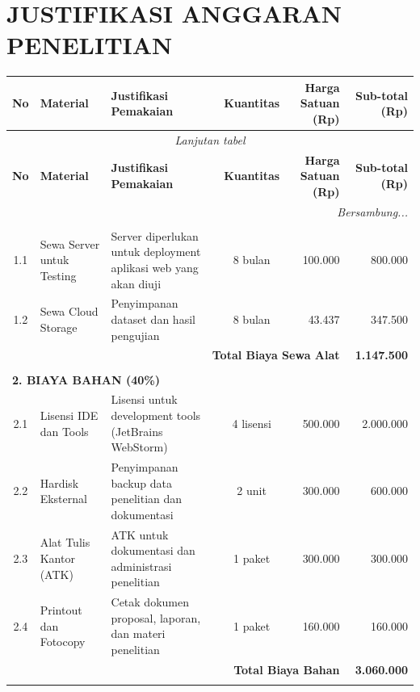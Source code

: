 \chapter{JUSTIFIKASI ANGGARAN PENELITIAN}

{\footnotesize
\begin{longtable}{|c|p{2.5cm}|p{3.5cm}|c|r|r|}
\hline
\textbf{No} & \textbf{Material} & \textbf{Justifikasi Pemakaian} & \textbf{Kuantitas} & \textbf{Harga Satuan (Rp)} & \textbf{Sub-total (Rp)} \\
\hline
\endfirsthead

\multicolumn{6}{c}{\textit{Lanjutan tabel}} \\
\hline
\textbf{No} & \textbf{Material} & \textbf{Justifikasi Pemakaian} & \textbf{Kuantitas} & \textbf{Harga Satuan (Rp)} & \textbf{Sub-total (Rp)} \\
\hline
\endhead

\hline
\multicolumn{6}{r}{\textit{Bersambung...}} \\
\endfoot

\hline
\endlastfoot

\multicolumn{6}{|l|}{\textbf{1. BIAYA SEWA ALAT (15\%)}} \\
\hline
1.1 & Sewa Server untuk Testing & Server diperlukan untuk deployment aplikasi web yang akan diuji & 8 bulan & 100.000 & 800.000 \\
\hline
1.2 & Sewa Cloud Storage & Penyimpanan dataset dan hasil pengujian & 8 bulan & 43.437 & 347.500 \\
\hline
\multicolumn{5}{|r|}{\textbf{Total Biaya Sewa Alat}} & \textbf{1.147.500} \\
\hline
\multicolumn{6}{c}{} \\
\hline

\multicolumn{6}{|l|}{\textbf{2. BIAYA BAHAN (40\%)}} \\
\hline
2.1 & Lisensi IDE dan Tools & Lisensi untuk development tools (JetBrains WebStorm) & 4 lisensi & 500.000 & 2.000.000 \\
\hline
2.2 & Hardisk Eksternal & Penyimpanan backup data penelitian dan dokumentasi & 2 unit & 300.000 & 600.000 \\
\hline
2.3 & Alat Tulis Kantor (ATK) & ATK untuk dokumentasi dan administrasi penelitian & 1 paket & 300.000 & 300.000 \\
\hline
2.4 & Printout dan Fotocopy & Cetak dokumen proposal, laporan, dan materi penelitian & 1 paket & 160.000 & 160.000 \\
\hline
\multicolumn{5}{|r|}{\textbf{Total Biaya Bahan}} & \textbf{3.060.000} \\
\hline
\multicolumn{6}{c}{} \\
\hline


\end{longtable}}
